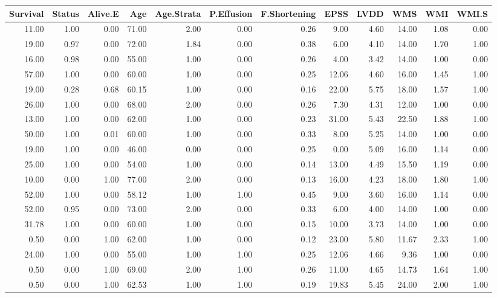 \documentclass[
]{article}
\begin{document}
\begin{tabular}{r|r|r|r|r|r|r|r|r|r|r|r}
\hline
Survival & Status & Alive.E & Age & Age.Strata & P.Effusion & F.Shortening & EPSS & LVDD & WMS & WMI & WMI.S\\
\hline
11.00 & 1.00 & 0.00 & 71.00 & 2.00 & 0.00 & 0.26 & 9.00 & 4.60 & 14.00 & 1.08 & 0.00\\
\hline
19.00 & 0.97 & 0.00 & 72.00 & 1.84 & 0.00 & 0.38 & 6.00 & 4.10 & 14.00 & 1.70 & 1.00\\
\hline
16.00 & 0.98 & 0.00 & 55.00 & 1.00 & 0.00 & 0.26 & 4.00 & 3.42 & 14.00 & 1.00 & 0.00\\
\hline
57.00 & 1.00 & 0.00 & 60.00 & 1.00 & 0.00 & 0.25 & 12.06 & 4.60 & 16.00 & 1.45 & 1.00\\
\hline
19.00 & 0.28 & 0.68 & 60.15 & 1.00 & 0.00 & 0.16 & 22.00 & 5.75 & 18.00 & 1.57 & 1.00\\
\hline
26.00 & 1.00 & 0.00 & 68.00 & 2.00 & 0.00 & 0.26 & 7.30 & 4.31 & 12.00 & 1.00 & 0.00\\
\hline
13.00 & 1.00 & 0.00 & 62.00 & 1.00 & 0.00 & 0.23 & 31.00 & 5.43 & 22.50 & 1.88 & 1.00\\
\hline
50.00 & 1.00 & 0.01 & 60.00 & 1.00 & 0.00 & 0.33 & 8.00 & 5.25 & 14.00 & 1.00 & 0.00\\
\hline
19.00 & 1.00 & 0.00 & 46.00 & 0.00 & 0.00 & 0.25 & 0.00 & 5.09 & 16.00 & 1.14 & 0.00\\
\hline
25.00 & 1.00 & 0.00 & 54.00 & 1.00 & 0.00 & 0.14 & 13.00 & 4.49 & 15.50 & 1.19 & 0.00\\
\hline
10.00 & 0.00 & 1.00 & 77.00 & 2.00 & 0.00 & 0.13 & 16.00 & 4.23 & 18.00 & 1.80 & 1.00\\
\hline
52.00 & 1.00 & 0.00 & 58.12 & 1.00 & 1.00 & 0.45 & 9.00 & 3.60 & 16.00 & 1.14 & 0.00\\
\hline
52.00 & 0.95 & 0.00 & 73.00 & 2.00 & 0.00 & 0.33 & 6.00 & 4.00 & 14.00 & 1.00 & 0.00\\
\hline
31.78 & 1.00 & 0.00 & 60.00 & 1.00 & 0.00 & 0.15 & 10.00 & 3.73 & 14.00 & 1.00 & 0.00\\
\hline
0.50 & 0.00 & 1.00 & 62.00 & 1.00 & 0.00 & 0.12 & 23.00 & 5.80 & 11.67 & 2.33 & 1.00\\
\hline
24.00 & 1.00 & 0.00 & 55.00 & 1.00 & 1.00 & 0.25 & 12.06 & 4.66 & 9.36 & 1.00 & 0.00\\
\hline
0.50 & 0.00 & 1.00 & 69.00 & 2.00 & 1.00 & 0.26 & 11.00 & 4.65 & 14.73 & 1.64 & 1.00\\
\hline
0.50 & 0.00 & 1.00 & 62.53 & 1.00 & 1.00 & 0.19 & 19.83 & 5.45 & 24.00 & 2.00 & 1.00\\

\end{tabular}
\end{document}
